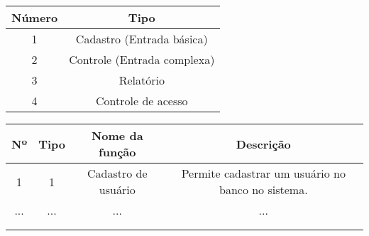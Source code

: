 \begin{center}
    
    \begin{tabular}{| c | c |}
        \hline
        \textbf{Número} & \textbf{Tipo} \\ \hline
        1 & Cadastro (Entrada básica) \\ \hline
        2 & Controle (Entrada complexa) \\ \hline
        3 & Relatório \\ \hline
        4 & Controle de acesso \\ \hline
    \end{tabular}
    
    
    \vspace{0.5cm}
    
    \begin{tabular}{| c | c | c | c |}
        \hline
        \textbf{Nº} & \textbf{Tipo} & \textbf{Nome da função} & \textbf{Descrição} \\ \hline
        1 & 1 & Cadastro de usuário & Permite cadastrar um usuário no banco no sistema.\\ \hline
        ... & ... & ... & ... \\ \hline
         & & & \\ \hline
         & & & \\ \hline
    \end{tabular}
    
    
\end{center}